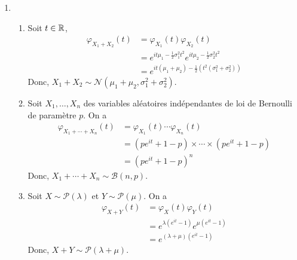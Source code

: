 {\begin{td-sol}[]
\begin{enumerate}
            \item \,
            \begin{enumerate}
                \item Soit \(t \in \mathbb{R}\),
                \begin{equation*}
                    \begin{aligned}
                        \varphi_{X_1+X_2}(t)
                        &= \varphi_{X_1}(t)\varphi_{X_2}(t)\\
                        &= e^{it\mu_1 - \frac{1}{2}\sigma_1^2t^2}e^{it\mu_2 - \frac{1}{2}\sigma_2^2t^2}\\
                        &= e^{it(\mu_1 + \mu_2) - \frac{1}{2}(t^2(\sigma_1^2 + \sigma_2^2))}
                    \end{aligned}
                \end{equation*}
                Donc, \(X_1 + X_2 \sim \mathcal N(\mu_1 + \mu_2, \sigma_1^2 + \sigma_2^2)\).

                \item Soit \(X_1, \ldots, X_n\) des variables aléatoires
                indépendantes de loi de Bernoulli de paramètre \(p\).
                On a
                \begin{equation*}
                    \begin{aligned}
                        \varphi_{X_1 + \cdots + X_n}(t)
                        &= \varphi_{X_1}(t)\cdots\varphi_{X_n}(t)\\
                        &= (pe^{it} + 1 - p) \times \cdots \times (pe^{it} + 1 - p)\\
                        &= {(pe^{it} + 1 - p)}^n
                    \end{aligned}
                \end{equation*}
                Donc, \(X_1 + \cdots + X_n \sim \mathcal B(n,p)\).

                \item Soit \(X \sim \mathcal P(\lambda)\) et \(Y \sim \mathcal P(\mu)\).
                On a
                \begin{equation*}
                    \begin{aligned}
                        \varphi_{X+Y}(t)
                        &= \varphi_X(t)\varphi_Y(t)\\
                        &= e^{\lambda(e^{it} - 1)}e^{\mu(e^{it} - 1)}\\
                        &= e^{(\lambda + \mu)(e^{it} - 1)}
                    \end{aligned}
                \end{equation*}
                Donc, \(X + Y \sim \mathcal P(\lambda + \mu)\).
            \end{enumerate}
        \end{enumerate}
    \end{td-sol}
}{}

